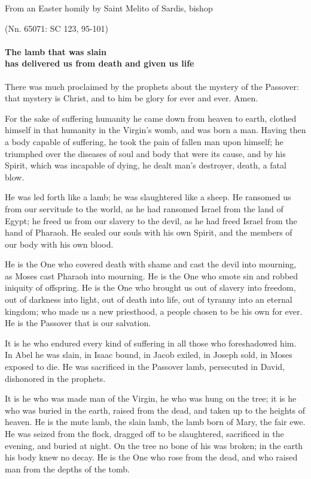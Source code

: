 From an Easter homily by Saint Melito of Sardis, bishop

\par \hfill(Nn. 65071: SC 123, 95-101)

\paragraph{The lamb that was slain\\ has delivered us from death and given us life}

There was much proclaimed by the prophets about the mystery of the Passover: that mystery is Christ, and to him be glory for ever and ever. Amen.

For the sake of suffering humanity he came down from heaven to earth, clothed himself in that humanity in the Virgin’s womb, and was born a man. Having then a body capable of suffering, he took the pain of fallen man upon himself; he triumphed over the diseases of soul and body that were its cause, and by his Spirit, which was incapable of dying, he dealt man’s destroyer, death, a fatal blow.

He was led forth like a lamb; he was slaughtered like a sheep. He ransomed us from our servitude to the world, as he had ransomed Israel from the land of Egypt; he freed us from our slavery to the devil, as he had freed Israel from the hand of Pharaoh. He sealed our souls with his own Spirit, and the members of our body with his own blood.

He is the One who covered death with shame and cast the devil into mourning, as Moses cast Pharaoh into mourning. He is the One who smote sin and robbed iniquity of offspring. He is the One who brought us out of slavery into freedom, out of darkness into light, out of death into life, out of tyranny into an eternal kingdom; who made us a new priesthood, a people chosen to be his own for ever. He is the Passover that is our salvation.

It is he who endured every kind of suffering in all those who foreshadowed him. In Abel he was slain, in Isaac bound, in Jacob exiled, in Joseph sold, in Moses exposed to die. He was sacrificed in the Passover lamb, persecuted in David, dishonored in the prophets.

It is he who was made man of the Virgin, he who was hung on the tree; it is he who was buried in the earth, raised from the dead, and taken up to the heights of heaven. He is the mute lamb, the slain lamb, the lamb born of Mary, the fair ewe. He was seized from the flock, dragged off to be slaughtered, sacrificed in the evening, and buried at night. On the tree no bone of his was broken; in the earth his body knew no decay. He is the One who rose from the dead, and who raised man from the depths of the tomb.

